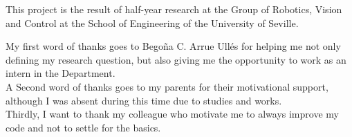 This project is the result of half-year research at the Group of Robotics, Vision and Control at the School of Engineering of the University of Seville.


My first word of thanks goes to Bego\~na C. Arrue Ull\'es for helping me not only defining my research question, but also giving me the opportunity to work as an intern in the Department. \\

A Second word of thanks goes to my parents for their motivational support, although I was absent during this time due to studies and works.  \\

Thirdly, I want to thank my colleague who motivate me to always improve my code and not to settle for the basics.  \\

